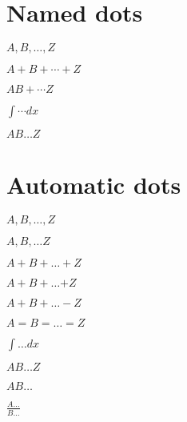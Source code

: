 \documentclass{article}
\begin{document}
\section{Named dots}
$A,B,\dotsc,Z$

$A + B +\dotsb +Z$

$A B +\dotsm Z$

$\int \dotsi dx$

$A B \dotso Z$


\section{Automatic dots}
$A,B,\dots,Z$

$A,B,\dots Z$

$A + B +\dots +Z$

$A + B +\dots \boldsymbol{+}Z$

$A + B +\dots -Z$

$A = B =\dots =Z$

$\int \dots dx$

$A B \dots Z$

$A B \dots$

$\frac{A \dots}{B\dots}$
\end{document}
